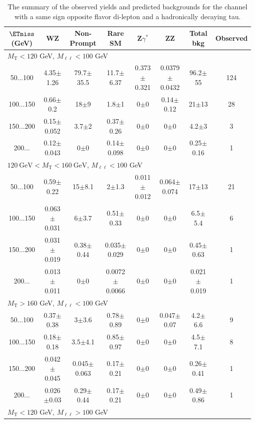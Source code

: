 \begin{landscape}
\begin{table}
\begin{center}
\caption{\label{tab:OSOFtau1} The summary of the observed yields and predicted backgrounds for the channel 
with a same sign opposite flavor di-lepton and a hadronically decaying tau. }
\begin{tabular}{| c | c c c c c c   c | }\hline\hline
$\ETmiss$ (GeV) & WZ & Non-Prompt & Rare SM & Z$\gamma^*$ & ZZ & Total bkg & Observed\\\hline\hline
\multicolumn{8}{l}{$M_{\text{T}} < 120$ GeV, $M_{\ell\ell} < 100$ GeV}\\\hline\hline
50$\dots$100&4.35$\pm$1.26&79.7$\pm$35.5&11.7$\pm$6.37&0.373$\pm$0.321&0.0379$\pm$0.0432&96.2$\pm$55&124\\
100$\dots$150&0.66$\pm$0.2&18$\pm$9&1.8$\pm$1&0$\pm$0&0.14$\pm$0.12&21$\pm$13&28\\
150$\dots$200&0.15$\pm$0.052&3.7$\pm$2&0.37$\pm$0.26&0$\pm$0&0$\pm$0&4.2$\pm$3&3\\
200$\dots$&0.12$\pm$0.043&0$\pm$0&0.14$\pm$0.098&0$\pm$0&0$\pm$0&0.25$\pm$0.16&1\\
\hline\hline
\multicolumn{8}{l}{$120~\mathrm{GeV} < M_{\text{T}} < 160~\mathrm{GeV}$, $M_{\ell\ell} < 100$ GeV}\\\hline\hline
50$\dots$100&0.59$\pm$0.22&15$\pm$8.1&2$\pm$1.3&0.011$\pm$0.012&0.064$\pm$0.074&17$\pm$13&21\\
100$\dots$150&0.063$\pm$0.031&6$\pm$3.7&0.51$\pm$0.33&0$\pm$0&0$\pm$0&6.5$\pm$5.4&6\\
150$\dots$200&0.031$\pm$0.019&0.38$\pm$0.44&0.035$\pm$0.029&0$\pm$0&0$\pm$0&0.45$\pm$0.63&1\\
200$\dots$&0.013$\pm$0.011&0$\pm$0&0.0072$\pm$0.0066&0$\pm$0&0$\pm$0&0.021$\pm$0.019&1\\
\hline\hline
\multicolumn{8}{l}{$M_{\text{T}} > 160$ GeV, $M_{\ell\ell} < 100$ GeV}\\\hline\hline
50$\dots$100&0.37$\pm$0.38&3$\pm$3.6&0.78$\pm$0.89&0$\pm$0&0.047$\pm$0.07&4.2$\pm$6.6&9\\
100$\dots$150&0.18$\pm$0.18&3.5$\pm$4.1&0.85$\pm$0.97&0$\pm$0&0$\pm$0&4.5$\pm$7.1&8\\
150$\dots$200&0.042$\pm$0.045&0.045$\pm$0.063&0.17$\pm$0.21&0$\pm$0&0$\pm$0&0.26$\pm$0.41&1\\
200$\dots$&0.026$\pm$0.03&0.29$\pm$0.44&0.17$\pm$0.21&0$\pm$0&0$\pm$0&0.49$\pm$0.86&1\\
\hline\hline
\multicolumn{8}{l}{$M_{\text{T}} < 120$ GeV, $M_{\ell\ell} > 100$ GeV}\\\hline\hline

\end{tabular}
\end{center}
\end{table}
\end{landscape}
